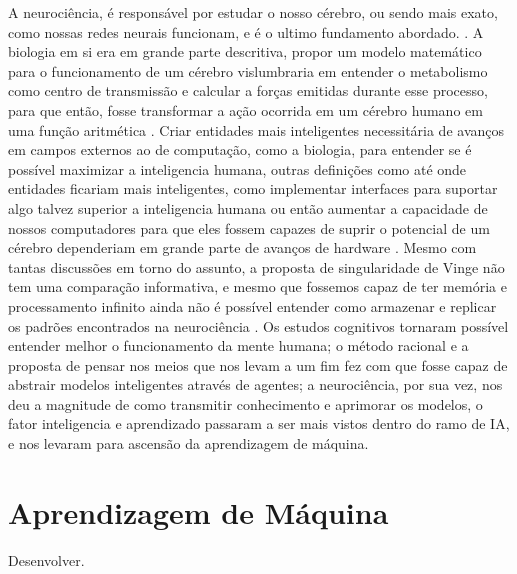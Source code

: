 A neurociência, é responsável por estudar o nosso cérebro, ou sendo mais exato, como nossas redes neurais funcionam, e é o ultimo fundamento abordado. \cite[10]{russell2003artificial}. A biologia em si era em grande parte descritiva, propor um modelo matemático para o funcionamento de um cérebro vislumbraria em entender o metabolismo como centro de transmissão e calcular a forças emitidas durante esse processo, para que então, fosse transformar a ação ocorrida em um cérebro humano em uma função aritmética \cite[1-3]{rashevsky1960mathematical}. Criar entidades mais inteligentes necessitária de avanços em campos externos ao de computação, como a biologia, para entender se é possível maximizar a inteligencia humana, outras definições como até onde entidades ficariam mais inteligentes, como implementar interfaces para suportar algo talvez superior a inteligencia humana ou então aumentar a capacidade de nossos computadores para que eles fossem capazes de suprir o potencial de um cérebro dependeriam em grande parte de avanços de hardware \cite[1-2]{vinge1993coming}. Mesmo com tantas discussões em torno do assunto, a proposta de singularidade de Vinge não tem uma comparação informativa, e mesmo que fossemos capaz de ter memória e processamento infinito ainda não é possível entender como armazenar e replicar os padrões encontrados na neurociência \cite[11-12]{russell2003artificial}. Os estudos cognitivos tornaram possível entender melhor o funcionamento da mente humana; o método racional e a proposta de pensar nos meios que nos levam a um fim fez com que fosse capaz de abstrair modelos inteligentes através de agentes; a neurociência, por sua vez, nos deu a magnitude de como transmitir conhecimento e aprimorar os modelos, o fator inteligencia e aprendizado passaram a ser mais vistos dentro do ramo de IA, e nos levaram para ascensão da aprendizagem de máquina.

\section{Aprendizagem de Máquina}
Desenvolver.
